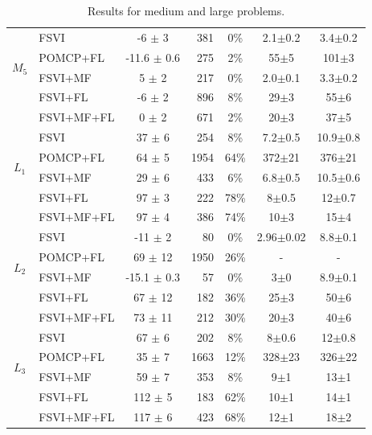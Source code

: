 \documentclass[letterpaper]{article} %
\newcommand{\itay}[1]{}
\begin{document}
\begin{table}
{\begin{tabular}{ |c|l|c|r|c|c|c| }
\hline\hline
\multirow{4}{*}{$M_5$}
& FSVI\itay{+} & -6 $\pm$ 3 & 381 & 0\% & 2.1$\pm$0.2 & 3.4$\pm$0.2 \\
& POMCP+FL\itay{+} & -11.6 $\pm$ 0.6 & 275 & 2\% & 55$\pm$5 & 101$\pm$3 \\
& FSVI+MF\itay{+} & 5 $\pm$ 2 & 217 & 0\% & 2.0$\pm$0.1 & 3.3$\pm$0.2 \\
&FSVI+FL\itay{+} & -6 $\pm$ 2 & 896 & 8\% & 29$\pm$3 & 55$\pm$6 \\
& FSVI+MF+FL\itay{+} & 0 $\pm$ 2 & 671 & 2\% & 20$\pm$3 & 37$\pm$5 \\
\hline\hline
\multirow{4}{*}{$L_1$}
& FSVI\itay{+} & 37 $\pm$ 6 & 254 & 8\% &  7.2$\pm$0.5 & 10.9$\pm$0.8 \\
& POMCP+FL\itay{+} & 64 $\pm$ 5 & 1954 & 64\% &  372$\pm$21 & 376$\pm$21 \\
& FSVI+MF\itay{+} & 29 $\pm$ 6 & 433 & 6\% &  6.8$\pm$0.5 & 10.5$\pm$0.6 \\
&FSVI+FL\itay{+} & 97 $\pm$ 3 & 222 & 78\% &  8$\pm$0.5 & 12$\pm$0.7 \\
& FSVI+MF+FL\itay{+} & 97 $\pm$ 4 & 386 & 74\% &  10$\pm$3 & 15$\pm$4 \\
\hline\hline
\multirow{4}{*}{$L_2$}
& FSVI\itay{+} & -11 $\pm$ 2 & 80 & 0\% &  2.96$\pm$0.02 & 8.8$\pm$0.1 \\
& POMCP+FL\itay{-} & 69 $\pm$ 12 & 1950 & 26\% &  - & - \\
& FSVI+MF\itay{+} & -15.1 $\pm$ 0.3 & 57 & 0\% &  3$\pm$0 & 8.9$\pm$0.1 \\
&FSVI+FL\itay{+} & 67 $\pm$ 12 & 182 & 36\% &  25$\pm$3 & 50$\pm$6 \\
& FSVI+MF+FL\itay{+} & 73 $\pm$ 11 & 212 & 30\% & 20$\pm$3 & 40$\pm$6 \\
\hline \hline
\multirow{4}{*}{$L_3$}
& FSVI\itay{+} & 67 $\pm$ 6 & 202 & 8\% & 8$\pm$0.6 & 12$\pm$0.8 \\
& POMCP+FL\itay{+} & 35 $\pm$ 7 & 1663 & 12\% & 328$\pm$23 & 326$\pm$22 \\
& FSVI+MF\itay{+} & 59 $\pm$ 7 & 353 & 8\% & 9$\pm$1 & 13$\pm$1 \\
&FSVI+FL\itay{+} & 112 $\pm$ 5 & 183 & 62\% & 10$\pm$1 & 14$\pm$1 \\
& FSVI+MF+FL\itay{+} & 117 $\pm$ 6 & 423 & 68\% & 12$\pm$1 & 18$\pm$2 \\
\hline
\end{tabular}
}
\caption{Results for medium and large problems.}%
\label{tab:large-results}
\end{table}
\end{document}
